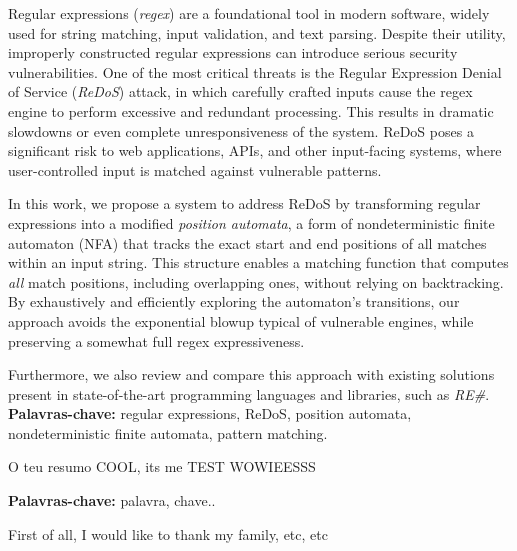 








Regular expressions (\emph{regex}) are a foundational tool in modern software, widely used for string matching, input validation, and text parsing. Despite their utility, improperly constructed regular expressions can introduce serious security vulnerabilities. One of the most critical threats is the Regular Expression Denial of Service (\emph{ReDoS}) attack, in which carefully crafted inputs cause the regex engine to perform excessive and redundant processing. This results in dramatic slowdowns or even complete unresponsiveness of the system. ReDoS poses a significant risk to web applications, APIs, and other input-facing systems, where user-controlled input is matched against vulnerable patterns.

In this work, we propose a system to address ReDoS by transforming regular expressions into a modified \emph{position automata}, a form of nondeterministic finite automaton (NFA) that tracks the exact start and end positions of all matches within an input string. This structure enables a matching function that computes \emph{all} match positions, including overlapping ones, without relying on backtracking. By exhaustively and efficiently exploring the automaton's transitions, our approach avoids the exponential blowup typical of vulnerable engines, while preserving a somewhat full regex expressiveness.

Furthermore, we also review and compare this approach with existing solutions present in state-of-the-art programming languages and libraries, such as \emph{RE\#}.
\textbf{Palavras-chave:} regular expressions, ReDoS, position automata, nondeterministic finite automata, pattern matching.

O teu resumo COOL, its me TEST WOWIEESSS

\textbf{Palavras-chave:} palavra, chave..


First of all, I would like to thank my family, etc, etc
